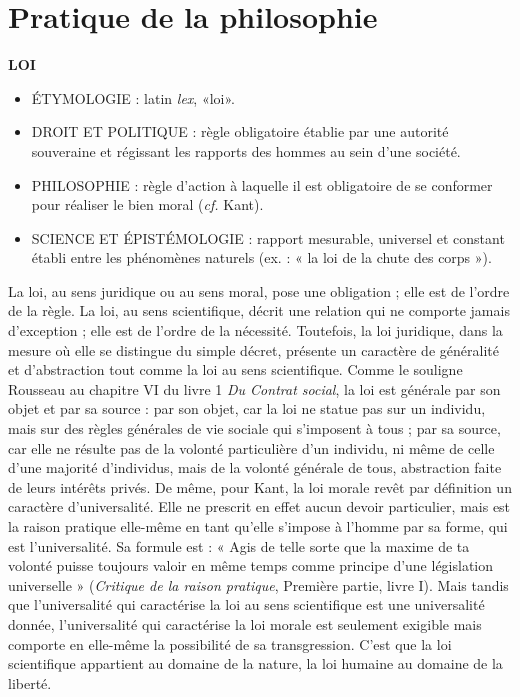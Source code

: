 
\section{Pratique de la philosophie}

{\bf LOI}

\vspace{0.35cm}
%
\begin{itemize}[leftmargin=1cm, label=, itemsep=1pt]
\item {\footnotesize ÉTYMOLOGIE} : latin {\it lex}, «loi».
\item {\footnotesize DROIT ET POLITIQUE} : règle obligatoire établie par une autorité souveraine et régissant les rapports des
hommes au sein d'une société.
\item {\footnotesize PHILOSOPHIE} : règle d'action à laquelle il est obligatoire de se
conformer pour réaliser le bien moral ({\it cf.} Kant).
\item {\footnotesize SCIENCE ET ÉPISTÉMOLOGIE} : rapport mesurable, universel et constant établi entre les phénomènes naturels (ex. : « la loi de la chute des corps »).
\end{itemize}


La loi, au sens juridique ou au sens moral,
pose une obligation ; elle est de l’ordre de
la règle. La loi, au sens scientifique, décrit
une relation qui ne comporte jamais d’exception ; elle est de l’ordre de la nécessité.
Toutefois, la loi juridique, dans la mesure
où elle se distingue du simple décret, présente un caractère de généralité et
 d’abstraction tout comme la loi au sens scientifique. Comme le souligne Rousseau au
chapitre {\footnotesize VI} du livre 1 {\it Du Contrat social}, la
loi est générale par son objet et par sa
source : par son objet, car la loi ne statue
pas sur un individu, mais sur des règles
générales de vie sociale qui s'imposent à
tous ; par sa source, car elle ne résulte pas
de la volonté particulière d’un individu, ni
même de celle d'une majorité d'individus,
mais de la volonté générale de tous, abstraction faite de leurs intérêts privés. De
même, pour Kant, la loi morale revêt par
définition un caractère d'universalité. Elle
ne prescrit en effet aucun devoir particulier, mais est la raison pratique elle-même
en tant qu'elle s'impose à l’homme par sa
forme, qui est l’universalité. Sa formule
est : « Agis de telle sorte que la maxime de
ta volonté puisse toujours valoir en même
temps comme principe d'une législation
universelle » ({\it Critique de la raison pratique}, Première partie, livre I). Mais tandis
que l'universalité qui caractérise la loi au
sens scientifique est une universalité donnée, l'universalité qui caractérise la loi
morale est seulement exigible mais
comporte en elle-même la possibilité de sa
transgression. C'est que la loi scientifique
appartient au domaine de la nature, la loi
humaine au domaine de la liberté.


